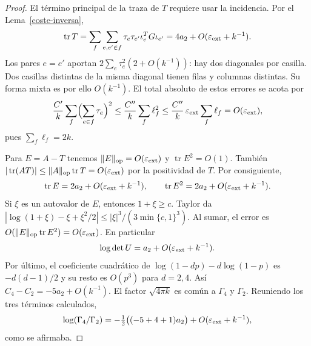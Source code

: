 \begin{proof}
El término principal de la traza de $T$ requiere usar la incidencia. Por el Lema~\ref{coste-inversa},
\[
 \operatorname{tr}T
 =\sum_f\sum_{e,e'\in f}\tau_e\tau_{e'}\iota_e^TG\iota_{e'}
 =4a_2+O(\varepsilon_{\rm ext}+k^{-1}) .
\]
Los pares $e=e'$ aportan $2\sum_e\tau_e^2(2+O(k^{-1}))$: hay dos diagonales por casilla. Dos casillas
distintas de la misma diagonal tienen filas y columnas distintas. Su forma mixta es por ello
$O(k^{-1})$. El total absoluto de estos errores se acota por
\[
 \frac{C'}k\sum_f\Bigl(\sum_{e\in f}\tau_e\Bigr)^2
 \le\frac{C''}k\sum_f\ell_f^2
 \le\frac{C''}k\,\varepsilon_{\rm ext}\sum_f\ell_f
 =O(\varepsilon_{\rm ext}),
\]
pues $\sum_f\ell_f=2k$.

Para $E=A-T$ tenemos $\|E\|_{\rm op}=O(\varepsilon_{\rm ext})$ y $\operatorname{tr}E^2=O(1)$. También
$|\operatorname{tr}(AT)|\le\|A\|_{\rm op}\operatorname{tr}T=O(\varepsilon_{\rm ext})$ por la
positividad de $T$. Por consiguiente,
\[
 \operatorname{tr}E=2a_2+O(\varepsilon_{\rm ext}+k^{-1}),\qquad
 \operatorname{tr}E^2=2a_2+O(\varepsilon_{\rm ext}+k^{-1}).
\]
Si $\xi$ es un autovalor de $E$, entonces $1+\xi\ge c$. Taylor da
$|\log(1+\xi)-\xi+\xi^2/2|\le|\xi|^3/(3\min\{c,1\}^3)$.
Al sumar, el error es $O(\|E\|_{\rm op}\operatorname{tr}E^2)=O(\varepsilon_{\rm ext})$. En particular
\[
 \log\det U=a_2+O(\varepsilon_{\rm ext}+k^{-1}).
\]
Por último, el coeficiente cuadrático de $\log(1-dp)-d\log(1-p)$ es $-d(d-1)/2$ y su resto es $O(p^3)$
para $d=2,4$. Así $C_4-C_2=-5a_2+O(k^{-1})$. El factor $\sqrt{4\pi k}$ es común a $\Gamma_4$ y
$\Gamma_2$. Reuniendo los tres términos calculados,
\[
 \log(\Gamma_4/\Gamma_2)
 =-\tfrac12\bigl((-5+4+1)a_2\bigr)
      +O(\varepsilon_{\rm ext}+k^{-1}),
\]
como se afirmaba.
\end{proof}
